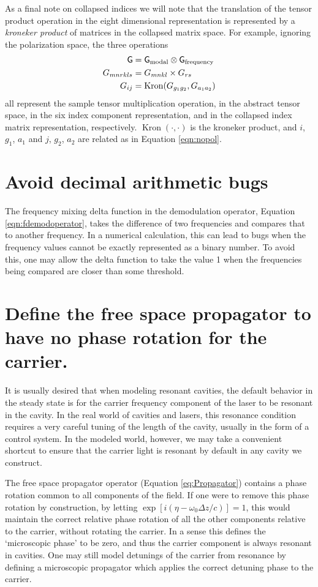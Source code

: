 As a final note on collapsed indices we will note that the translation of the tensor product operation in the eight dimensional representation is represented by a \emph{kroneker product} of matrices in the collapsed matrix space. %
For example, ignoring the polarization space, the three operations
\begin{align*}
\mathsf{G}&=\mathsf{G}_{\text{modal}}\otimes \mathsf{G}_{\text{frequency}}\\
G_{mnrkls}&=G_{mnkl}\times G_{rs}\\
G_{ij}&=\operatorname{Kron}(G_{g_1g_2},G_{a_1a_2})
\end{align*}
all represent the sample tensor multiplication operation, in the abstract tensor space, in the six index component representation, and in the collapsed index matrix representation, respectively. %
$\operatorname{Kron}(\cdot,\cdot)$ is the kroneker product, and $i$, $g_1$, $a_1$ and $j$, $g_2$, $a_2$ are related as in Equation \ref{eqn:nopol}.

\section{Avoid decimal arithmetic bugs}
The frequency mixing delta function in the demodulation operator, Equation \ref{eqn:fdemodoperator}, takes the difference of two frequencies and compares that to another frequency. %
In a numerical calculation, this can lead to bugs when the frequency values cannot be exactly represented as a binary number. %
To avoid this, one may allow the delta function to take the value 1 when the frequencies being compared are closer than some threshold.

\section{Define the free space propagator to have no phase rotation for the  carrier.}

It is usually desired that when modeling resonant cavities, the default behavior in the steady state is for the carrier frequency component of the laser to be resonant in the cavity. %
In the real world of cavities and lasers, this resonance condition requires a very careful tuning of the length of the cavity, usually in the form of a control system. %
In the modeled world, however, we may take a convenient shortcut to ensure that the carrier light is resonant by default in any cavity we construct.

The free space propagator operator (Equation \ref{eq:Propagator}) contains a phase rotation common to all components of the field. %
If one were to remove this phase rotation by construction, by letting $\exp[i(\eta - \omega_0 \Delta z/c)]=1$, this would maintain the correct relative phase rotation of all the other components relative to the carrier, without rotating the carrier. %
In a sense this defines the `microscopic phase' to be zero, and thus the  carrier component is always resonant in cavities. %
One may still model detunings of the carrier from resonance by defining a microscopic propagator which applies the correct detuning phase to the carrier.

